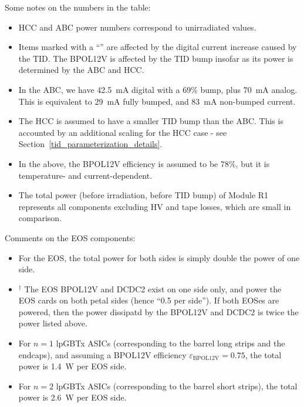 Some notes on the numbers in the table:
\begin{itemize}
\item HCC and ABC power numbers correspond to unirradiated values.
\item Items marked with a ``\tid'' are affected by the digital current increase caused by the TID.
The BPOL12V is affected by the TID bump insofar as its power is determined by the ABC and HCC.
\item In the ABC, we have 42.5~mA digital with a 69\% bump, plus 70~mA analog. This is equivalent to
29~mA fully bumped, and 83~mA non-bumped current.
\item The HCC is assumed to have a smaller TID bump than the ABC. This is accounted by an additional
scaling for the HCC case - see Section~\ref{tid_parameterization_details}.
\item In the above, the BPOL12V efficiency is assumed to be 78\%, but it is temperature- and
current-dependent.
\item The total power (before irradiation, before TID bump) of Module R1 represents
all components excluding HV and tape losses, which are small in comparison.
\end{itemize}

\noindent
Comments on the EOS components:

\begin{itemize}
\item For the EOS, the total power for both sides is simply double the power of one side.
\item $^\dagger$ The EOS BPOL12V and DCDC2 exist on one side only, and power the EOS cards on both petal
sides (hence ``0.5 per side''). If both EOSes are powered, then the power dissipatd by the BPOL12V and
DCDC2 is twice the power listed above.
\item For $n=1$ lpGBTx ASICs (corresponding to the barrel long strips and the endcaps),
and assuming a BPOL12V efficiency $\varepsilon_\text{BPOL12V}=0.75$,
the total power is 1.4~W per EOS side.
\item For $n=2$ lpGBTx ASICs (corresponding to the barrel short strips), the total power is 2.6~W per
EOS side.
\end{itemize}


